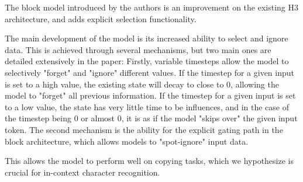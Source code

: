 The block model introduced by the authors is an improvement on the existing
H3\cite{h3} architecture, and adds explicit selection functionality.

The main development of the model is its increased ability to select and ignore
data.
This is achieved through several mechanisms, but two main ones are detailed
extensively in the paper:
Firstly, variable timesteps allow the model to selectively "forget" and "ignore"
different values.
If the timestep for a given input is set to a high value, the existing state
will decay to close to 0, allowing the model to "forget" all previous information.
If the timestep for a given input is set to a low value, the state has very little
time to be influences, and in the case of the timestep being 0 or almost 0, it
is as if the model "skips over" the given input token.
The second mechanism is the ability for the explicit gating path in the block
architecture, which allows models to "spot-ignore" input data.

This allows the model to perform well on copying tasks, which we hypothesize
is crucial for in-context character recognition.
